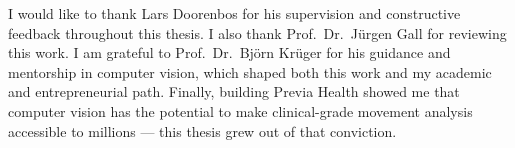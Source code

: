 I would like to thank Lars Doorenbos for his supervision and constructive feedback throughout this thesis. I also thank Prof.\ Dr.\ J\"urgen Gall for reviewing this work. I am grateful to Prof.\ Dr.\ Bj\"orn Kr\"uger for his guidance and mentorship in computer vision, which shaped both this work and my academic and entrepreneurial path. Finally, building Previa Health showed me that computer vision has the potential to make clinical-grade movement analysis accessible to millions --- this thesis grew out of that conviction.
